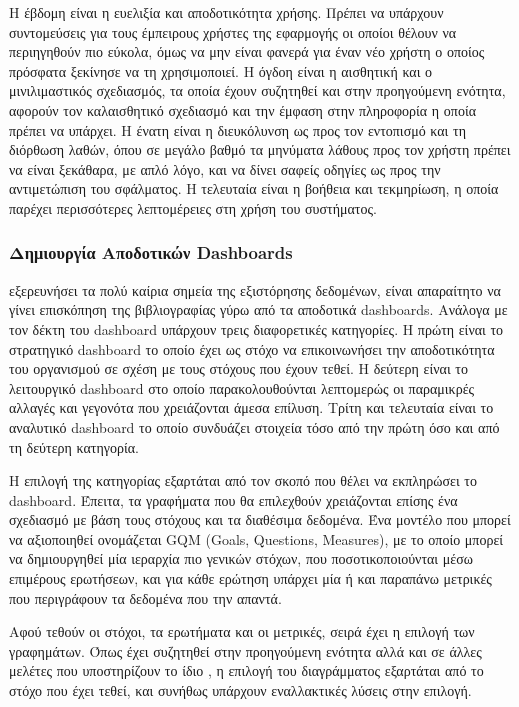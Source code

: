 \documentclass{article}
\begin{document}
Η έβδομη είναι η ευελιξία και αποδοτικότητα χρήσης. Πρέπει να υπάρχουν συντομεύσεις για τους έμπειρους χρήστες της εφαρμογής οι οποίοι θέλουν να περιηγηθούν πιο εύκολα, όμως να μην είναι φανερά για έναν νέο χρήστη ο οποίος πρόσφατα ξεκίνησε να τη χρησιμοποιεί. Η όγδοη είναι η αισθητική και ο μινιλιμαστικός σχεδιασμός, τα οποία έχουν συζητηθεί και στην προηγούμενη ενότητα, αφορούν τον καλαισθητικό σχεδιασμό και την έμφαση στην πληροφορία η οποία πρέπει να υπάρχει.
Η ένατη είναι η διευκόλυνση ως προς τον εντοπισμό και τη διόρθωση λαθών, όπου σε μεγάλο βαθμό τα μηνύματα λάθους προς τον χρήστη πρέπει να είναι ξεκάθαρα, με απλό λόγο, και να δίνει σαφείς οδηγίες ως προς την αντιμετώπιση του σφάλματος. Η τελευταία είναι η βοήθεια και τεκμηρίωση, η οποία παρέχει περισσότερες λεπτομέρειες στη χρήση του συστήματος.

\subsubsection{Δημιουργία Αποδοτικών Dashboards}

 εξερευνήσει τα πολύ καίρια σημεία της εξιστόρησης δεδομένων, είναι απαραίτητο να γίνει επισκόπηση της βιβλιογραφίας γύρω από τα αποδοτικά dashboards. Ανάλογα με τον δέκτη του dashboard υπάρχουν τρεις διαφορετικές κατηγορίες. Η πρώτη είναι το στρατηγικό dashboard το οποίο έχει ως στόχο να επικοινωνήσει την αποδοτικότητα του οργανισμού σε σχέση με τους στόχους που έχουν τεθεί. Η δεύτερη είναι το λειτουργικό dashboard στο οποίο παρακολουθούνται λεπτομερώς οι παραμικρές αλλαγές και γεγονότα που χρειάζονται άμεσα επίλυση. Τρίτη και τελευταία είναι το αναλυτικό dashboard το οποίο συνδυάζει στοιχεία τόσο από την πρώτη όσο και από τη δεύτερη κατηγορία. \cite{pappas2011riding}

Η επιλογή της κατηγορίας εξαρτάται από τον σκοπό που θέλει να εκπληρώσει το dashboard. Έπειτα, τα γραφήματα που θα επιλεχθούν χρειάζονται επίσης ένα σχεδιασμό με βάση τους στόχους και τα διαθέσιμα δεδομένα. Ένα μοντέλο που μπορεί να αξιοποιηθεί ονομάζεται GQM (Goals, Questions, Measures), με το οποίο μπορεί να δημιουργηθεί μία ιεραρχία πιο γενικών στόχων, που ποσοτικοποιούνται μέσω επιμέρους ερωτήσεων, και για κάθε ερώτηση υπάρχει μία ή και παραπάνω μετρικές που περιγράφουν τα δεδομένα που την απαντά. \cite{janes2013effective}

Αφού τεθούν οι στόχοι, τα ερωτήματα και οι μετρικές, σειρά έχει η επιλογή των γραφημάτων. Όπως έχει συζητηθεί στην προηγούμενη ενότητα αλλά και σε άλλες μελέτες που υποστηρίζουν το ίδιο \cite{knaflic2015storytelling, pappas2011riding}, η επιλογή του διαγράμματος εξαρτάται από το στόχο που έχει τεθεί, και συνήθως υπάρχουν εναλλακτικές λύσεις στην επιλογή.
\end{document}
